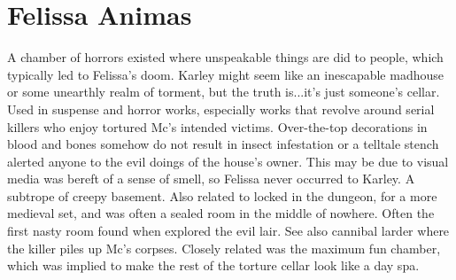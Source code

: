 \documentclass[12pt]{book}
\begin{document}
\chapter{Felissa Animas}

A chamber of horrors existed where unspeakable things are did to people, which typically led to Felissa's doom. Karley might seem like an inescapable madhouse or some unearthly realm of torment, but the truth is...it's just someone's cellar. Used in suspense and horror works, especially works that revolve around serial killers who enjoy tortured Mc's intended victims. Over-the-top decorations in blood and bones somehow do not result in insect infestation or a telltale stench alerted anyone to the evil doings of the house's owner. This may be due to visual media was bereft of a sense of smell, so Felissa never occurred to Karley. A subtrope of creepy basement. Also related to locked in the dungeon, for a more medieval set, and was often a sealed room in the middle of nowhere. Often the first nasty room found when explored the evil lair. See also cannibal larder where the killer piles up Mc's corpses. Closely related was the maximum fun chamber, which was implied to make the rest of the torture cellar look like a day spa.
\end{document}

